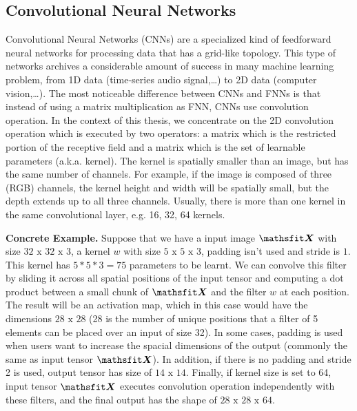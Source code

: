 \subsection{Convolutional Neural Networks}
Convolutional Neural Networks (CNNs) are a specialized kind of feedforward neural networks for processing data that has a grid-like topology. This type of networks archives a considerable amount of success in many machine learning problem, from 1D data (time-series audio signal,\dots) to 2D data (computer vision,\dots). The most noticeable difference between CNNs and FNNs is that instead of using a matrix multiplication as FNN, CNNs use convolution operation. In the context of this thesis, we concentrate on the 2D convolution operation which is executed by two operators: a matrix which is the restricted portion of the receptive field and a matrix which is the set of learnable parameters (a.k.a. kernel). The kernel is spatially smaller than an image, but has the same number of channels. For example, if the image is composed of three (RGB) channels, the kernel height and width will be spatially small, but the depth extends up to all three channels. Usually, there is more than one kernel in the same convolutional layer, e.g. 16, 32, 64 kernels.

\textbf{Concrete Example.} Suppose that we have a input image $\displaystyle \tX$ with size \newline $\displaystyle 32 \text{ x } 32 \text{ x } 3$, a kernel $\displaystyle w$ with size $\displaystyle 5 \text{ x } 5 \text{ x } 3$, padding isn't used and stride is $1$. This kernel has $\displaystyle 5 * 5 * 3 = 75$ parameters to be learnt. We can convolve this filter by sliding it across all spatial positions of the input tensor and computing a dot product between a small chunk of $\displaystyle \tX$ and the filter $\displaystyle w$ at each position. The result will be an activation map, which in this case would have the dimensions $28 \text{ x } 28$ (28 is the number of unique positions that a filter of 5 elements can be placed over an input of size 32). In some cases, padding is used when users want to increase the spacial dimensions of the output (commonly the same as input tensor $\displaystyle \tX$). In addition, if there is no padding and stride 2 is used, output tensor has size of $\displaystyle 14 \text{ x } 14$. Finally, if kernel size is set to 64, input tensor $\displaystyle \tX$ executes convolution operation independently with these filters, and the final output has the shape of $\displaystyle 28 \text{ x } 28 \text{ x } 64$.

